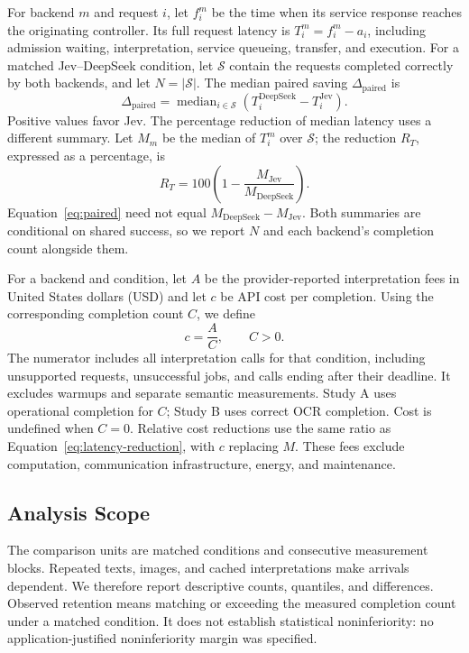 For backend $m$ and request $i$, let $f_i^m$ be the time when its service
response reaches the originating controller. Its full request latency is
$T_i^m=f_i^m-a_i$, including admission waiting, interpretation, service
queueing, transfer, and execution. For a matched Jev--DeepSeek condition,
let $\mathcal{S}$ contain the requests completed correctly by both backends,
and let $N=|\mathcal{S}|$. The median paired saving
$\Delta_{\mathrm{paired}}$ is
\begin{equation}
\Delta_{\mathrm{paired}}=
\operatorname{median}_{i\in\mathcal{S}}
\left(T_i^{\mathrm{DeepSeek}}-T_i^{\mathrm{Jev}}\right).
\label{eq:paired}
\end{equation}
Positive values favor Jev. The percentage reduction of median latency uses
a different summary. Let $M_m$ be the median of $T_i^m$ over $\mathcal{S}$;
the reduction $R_T$, expressed as a percentage, is
\begin{equation}
R_T=100\left(1-\frac{M_{\mathrm{Jev}}}{M_{\mathrm{DeepSeek}}}\right).
\label{eq:latency-reduction}
\end{equation}
Equation~\ref{eq:paired} need not equal $M_{\mathrm{DeepSeek}}-M_{\mathrm{Jev}}$.
Both summaries are conditional on shared success, so we report $N$ and each
backend's completion count alongside them.

For a backend and condition, let $A$ be the provider-reported interpretation fees in
United States dollars (USD) and let $c$ be API cost per completion. Using
the corresponding completion count $C$, we define
\begin{equation}
c=\frac{A}{C},\qquad C>0.
\label{eq:cost}
\end{equation}
The numerator includes all interpretation calls for that condition, including
unsupported requests, unsuccessful jobs, and calls ending after their
deadline. It excludes warmups and separate semantic measurements. Study A
uses operational completion for $C$; Study B uses correct OCR completion.
Cost is undefined when $C=0$. Relative cost reductions use the same ratio
as Equation~\ref{eq:latency-reduction}, with $c$ replacing $M$.
These fees exclude computation, communication infrastructure, energy, and
maintenance.

\subsection{Analysis Scope}
The comparison units are matched conditions and consecutive measurement
blocks. Repeated texts, images, and cached interpretations make arrivals
dependent. We therefore report descriptive counts, quantiles, and differences.
Observed retention means matching or exceeding the measured completion count
under a matched condition. It does not establish statistical noninferiority:
no application-justified noninferiority margin was specified.

